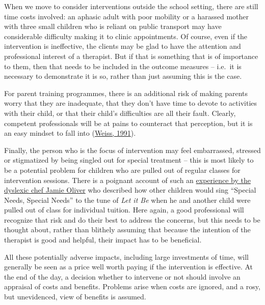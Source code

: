 \documentclass{krantz}
\begin{document}

When we move to consider interventions outside the school setting, there are still time costs involved: an aphasic adult with poor mobility or a harassed mother with three small children who is reliant on public transport may have considerable difficulty making it to clinic appointments. Of course, even if the intervention is ineffective, the clients may be glad to have the attention and professional interest of a therapist. But if that is something that is of importance to them, then that needs to be included in the outcome measures -- i.e.~it is necessary to demonstrate it is so, rather than just assuming this is the case.

For parent training programmes, there is an additional risk of making parents worry that they are inadequate, that they don't have time to devote to activities with their child, or that their child's difficulties are all their fault. Clearly, competent professionals will be at pains to counteract that perception, but it is an easy mindset to fall into (\protect\hyperlink{ref-weiss1991}{Weiss, 1991}).

Finally, the person who is the focus of intervention may feel embarrassed, stressed or stigmatized by being singled out for special treatment -- this is most likely to be a potential problem for children who are pulled out of regular classes for intervention sessions. There is a poignant account of such an \href{https://www.standard.co.uk/news/celebritynews/school-labelled-me-as-special-needs-says-chef-jamie-oliver-who-suffers-from-dyslexia-9033901.html}{experience by the dyslexic chef Jamie Oliver} who described how other children would sing ``Special Needs, Special Needs'' to the tune of \emph{Let it Be} when he and another child were pulled out of class for individual tuition. Here again, a good professional will recognize that risk and do their best to address the concerns, but this needs to be thought about, rather than blithely assuming that because the intention of the therapist is good and helpful, their impact has to be beneficial.

All these potentially adverse impacts, including large investments of time, will generally be seen as a price well worth paying if the intervention is effective. At the end of the day, a decision whether to intervene or not should involve an appraisal of costs and benefits. Problems arise when costs are ignored, and a rosy, but unevidenced, view of benefits is assumed.
\end{document}
